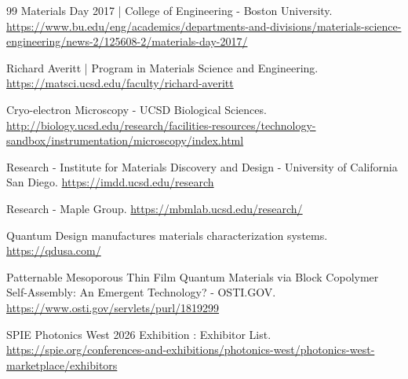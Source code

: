 \documentclass[11pt, a4paper]{article}
\begin{document}
\begin{thebibliography}{99}
 Materials Day 2017 | College of Engineering - Boston University. \url{https://www.bu.edu/eng/academics/departments-and-divisions/materials-science-engineering/news-2/125608-2/materials-day-2017/}

 Richard Averitt | Program in Materials Science and Engineering. \url{https://matsci.ucsd.edu/faculty/richard-averitt}

 Cryo-electron Microscopy - UCSD Biological Sciences. \url{http://biology.ucsd.edu/research/facilities-resources/technology-sandbox/instrumentation/microscopy/index.html}

 Research - Institute for Materials Discovery and Design - University of California San Diego. \url{https://imdd.ucsd.edu/research}

 Research - Maple Group. \url{https://mbmlab.ucsd.edu/research/}

 Quantum Design manufactures materials characterization systems. \url{https://qdusa.com/}

 Patternable Mesoporous Thin Film Quantum Materials via Block Copolymer Self-Assembly: An Emergent Technology? - OSTI.GOV. \url{https://www.osti.gov/servlets/purl/1819299}

 SPIE Photonics West 2026 Exhibition : Exhibitor List. \url{https://spie.org/conferences-and-exhibitions/photonics-west/photonics-west-marketplace/exhibitors}

\end{thebibliography}
\end{document}
